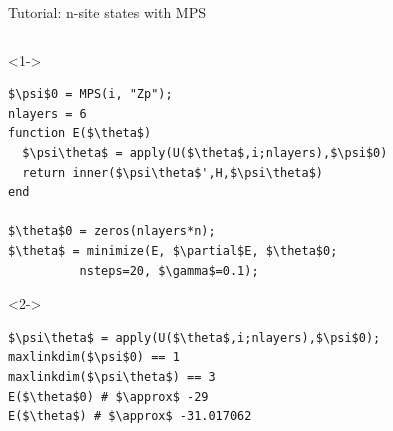 \begin{frame}[fragile]{Tutorial: n-site states with MPS}

\begin{columns}

\begin{column}{5.5cm}

\begin{onlyenv}<1->
\begin{lstlisting}[language=JuliaLocal, style=julia, mathescape, basicstyle=\scriptsize\ttfamily]
$\psi$0 = MPS(i, "Zp");
nlayers = 6
function E($\theta$)
  $\psi\theta$ = apply(U($\theta$,i;nlayers),$\psi$0)
  return inner($\psi\theta$',H,$\psi\theta$)
end

$\theta$0 = zeros(nlayers*n);
$\theta$ = minimize(E, $\partial$E, $\theta$0;
          nsteps=20, $\gamma$=0.1);
\end{lstlisting}
\end{onlyenv}

\begin{onlyenv}<2->
\begin{lstlisting}[language=JuliaLocal, style=julia, mathescape, basicstyle=\scriptsize\ttfamily]
$\psi\theta$ = apply(U($\theta$,i;nlayers),$\psi$0);
maxlinkdim($\psi$0) == 1
maxlinkdim($\psi\theta$) == 3
E($\theta$0) # $\approx$ -29
E($\theta$) # $\approx$ -31.017062
\end{lstlisting}
\end{onlyenv}

\end{column}

\begin{column}{4.5cm}



\end{column}
\end{columns}
\end{frame}

